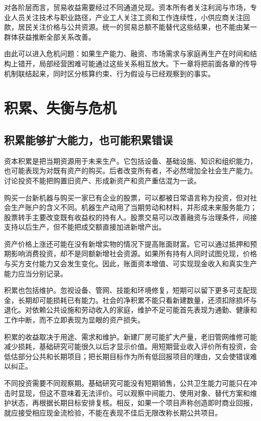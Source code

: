 \documentclass[UTF8,fontset=fandol,zihao=-4,oneside,openany]{ctexbook}
\begin{document}
对各阶层而言，贸易收益需要经过不同通道兑现。资本所有者关注利润与市场，专业人员关注技术与职业路径，产业工人关注工资和工作连续性，小供应商关注回款，居民关注价格与公共资源。统一的贸易总额不能替代这些结果，也不能由某一群体获益推断全部关系改善。

由此可以进入危机问题：如果生产能力、融资、市场需求与家庭再生产在时间和结构上错开，局部经营困难可能通过这些关系相互放大。下一章将把前面各章的传导机制联结起来，同时区分核算约束、行为假设与已经观察到的事实。

\chapter{积累、失衡与危机}
\section{积累能够扩大能力，也可能积累错误}
资本积累是把当期资源用于未来生产。它包括设备、基础设施、知识和组织能力，也可能表现为对既有资产的购买。后者改变所有者，不必然增加全社会生产能力。讨论投资不能把购置旧资产、形成新资产和资产重估混为一谈。

\label{arg:P223}
购买一台新机器与购买一家已有企业的股票，可以都被日常语言称为投资，但对社会生产账户的含义不同。机器生产动用了当期劳动和材料，并形成未来服务能力；股票转手主要改变既有收益权的持有人。股票交易可以改善融资与治理条件，间接支持以后生产，但不能把成交额直接加进新增产出。

资产价格上涨还可能在没有新增实物的情况下提高账面财富。它可以通过抵押和预期影响消费投资，却不是同额新增社会资源。如果所有持有人同时试图兑现，价格与买方支付能力又会发生变化。因此，账面资本增值、可实现现金收入和真实生产能力应当分别记录。

积累也包括维护。忽视设备、管网、技能和环境修复，短期可以留下更多可支配现金，长期却可能损耗已有能力。社会的净积累不能只看新建数量，还须扣除损坏与退化。对依赖公共设施和劳动收入的家庭，维护不足可能首先表现为通勤、健康和工作中断，而不立即表现为显眼的资产损失。

积累的收益取决于用途、需求和维护。新建厂房可能扩大产量，老旧管网维修可能减少损耗，基础研究可能很久以后才显示价值。用短期营业收入评价所有投资，会低估部分公共和长期项目；把长期目标作为所有低回报项目的理由，又会使错误难以纠正。

\label{arg:P224}
不同投资需要不同观察期。基础研究可能没有短期销售，公共卫生能力可能只在冲击时显现，但这不意味着无法评价。可以观察中间能力、使用对象、替代方案和维护状态，再根据长期目标安排复核。相反，如果一个项目声称创造即时商业回报，就应接受相应现金流检验，不能在表现不佳后无限改称长期公共项目。
\end{document}

